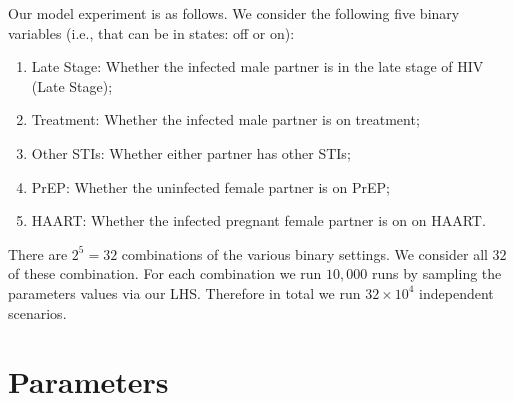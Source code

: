 \documentclass[11pt]{nih_mod}
\begin{document}
Our model experiment is as follows. We consider the following five binary variables (i.e., that can be in states: off or on): 
\begin{enumerate}
	\item Late Stage: Whether the infected male partner is in the late stage of HIV (Late Stage);
	\item Treatment: Whether the infected male partner is on treatment; 
	\item Other STIs: Whether either partner has other STIs; 
	\item PrEP: Whether the uninfected female partner is on PrEP;
	\item HAART: Whether the infected pregnant female partner is on on HAART.
\end{enumerate}
There are $2^5=32$ combinations of the various binary settings. We consider all $32$ of these combination. For each combination we run $10,000$ runs by sampling the parameters values via our LHS. Therefore in total we run $32 \times 10^4$ independent scenarios. 

\section{Parameters}
\label{sec:parametes}
\end{document}
